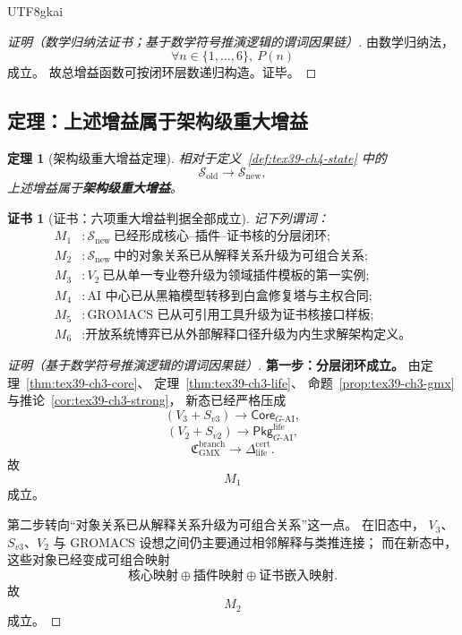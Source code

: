 \documentclass[12pt]{article}
\newtheorem{theorem}{定理}[section]
\newtheorem{Certificate}{证书}[section]
\begin{document}
\begin{CJK*}{UTF8}{gkai}
\begin{proof}[证明（数学归纳法证书；基于数学符号推演逻辑的谓词因果链）]
由数学归纳法，
\[
  \forall n\in\{1,\dots,6\},\ P(n)
\]
成立。
故总增益函数可按闭环层数递归构造。证毕。
\end{proof}

\subsection{定理：上述增益属于架构级重大增益}
\label{subsec:tex39-ch4-theorem}

\begin{theorem}[架构级重大增益定理]
\label{thm:tex39-ch4-major}
相对于定义~\ref{def:tex39-ch4-state} 中的
\[
  \mathcal S_{\mathrm{old}}
  \to
  \mathcal S_{\mathrm{new}},
\]
上述增益属于\textbf{架构级重大增益}。
\end{theorem}

\begin{Certificate}[证书：六项重大增益判据全部成立]
\label{cert:tex39-ch4-major}
记下列谓词：
\[
\begin{aligned}
  M_1 &: \mathcal S_{\mathrm{new}}\ \text{已经形成核心--插件--证书核的分层闭环};\\
  M_2 &: \mathcal S_{\mathrm{new}}\ \text{中的对象关系已从解释关系升级为可组合关系};\\
  M_3 &: V_2\ \text{已从单一专业卷升级为领域插件模板的第一实例};\\
  M_4 &: \text{AI 中心已从黑箱模型转移到白盒修复塔与主权合同};\\
  M_5 &: \text{GROMACS 已从可引用工具升级为证书核接口样板};\\
  M_6 &: \text{开放系统博弈已从外部解释口径升级为内生求解架构定义。}
\end{aligned}
\]
\end{Certificate}

\begin{proof}[证明（基于数学符号推演逻辑的谓词因果链）]
\textbf{第一步：分层闭环成立。}
由定理~\ref{thm:tex39-ch3-core}、
定理~\ref{thm:tex39-ch3-life}、
命题~\ref{prop:tex39-ch3-gmx}
与推论~\ref{cor:tex39-ch3-strong}，
新态已经严格压成
\[
  (V_3+S_{v3})
  \to
  \mathsf{Core}_{G\text{-AI}},
\]
\[
  (V_2+S_{v2})
  \to
  \mathsf{Pkg}_{G\text{-AI}}^{\mathrm{life}},
\]
\[
  \mathfrak C_{\mathrm{GMX}}^{\mathrm{branch}}
  \to
  \Delta_{\mathrm{life}}^{\mathrm{cert}}.
\]
故
\[
  M_1
\]
成立。

第二步转向“对象关系已从解释关系升级为可组合关系”这一点。
在旧态中，
$V_3$、$S_{v3}$、$V_2$ 与 GROMACS 设想之间仍主要通过相邻解释与类推连接；
而在新态中，
这些对象已经变成可组合映射
\[
  \text{核心映射}
  \oplus
  \text{插件映射}
  \oplus
  \text{证书嵌入映射}.
\]
故
\[
  M_2
\]
成立。


\end{proof}
\end{CJK*}
\end{document}
